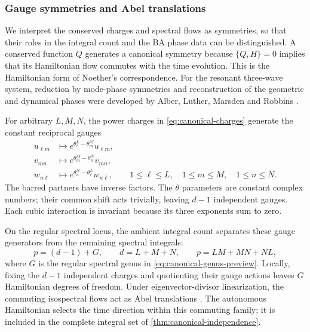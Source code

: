 \subsubsection{Gauge symmetries and Abel translations}
\label{sec:gauge-Abel-symmetries}

We interpret the conserved charges and spectral flows as symmetries,
so that their roles in the integral count and the BA phase data can
be distinguished. A conserved function $Q$ generates a canonical
symmetry because $\{Q,H\}=0$ implies that its Hamiltonian flow
commutes with the time evolution. This is the Hamiltonian form of
Noether's correspondence.
For the resonant three-wave system, reduction by mode-phase symmetries
and reconstruction of the geometric and dynamical phases were developed
by Alber, Luther, Marsden and Robbins
\cite[Sections~2--4]{AlberLutherMarsdenRobbins1998}.

For arbitrary $L,M,N$, the power charges in
\cref{eq:canonical-charges} generate the constant reciprocal gauges
\begin{equation}\label{eq:general-mode-gauge-action}
\begin{aligned}
 u_{\ell m}&\longmapsto e^{\theta_\ell^L-\theta_m^M}u_{\ell m},\\
 v_{mn}&\longmapsto e^{\theta_m^M-\theta_n^N}v_{mn},\\
 w_{n\ell}&\longmapsto e^{\theta_n^N-\theta_\ell^L}w_{n\ell},
 \qquad1\leq\ell\leq L,\quad1\leq m\leq M,\quad1\leq n\leq N.
\end{aligned}
\end{equation}
The barred partners have inverse factors. The $\theta$ parameters
are constant complex numbers; their common shift acts trivially,
leaving $d-1$ independent gauges. Each cubic interaction is invariant
because its three exponents sum to zero.

On the regular spectral locus, the ambient integral count separates these gauge generators
from the remaining spectral integrals:
\begin{equation}\label{eq:gauge-translation-count}
 p=(d-1)+G,\qquad d=L+M+N,
 \qquad p=LM+MN+NL,
\end{equation}
where $G$ is the regular spectral genus in
\cref{eq:canonical-genus-preview}. Locally, fixing the $d-1$ independent
charges and quotienting their gauge actions leaves $G$ Hamiltonian
degrees of freedom. Under eigenvector-divisor linearization, the
commuting isospectral flows act as Abel translations
\cite{Beauville1990,Vanhaecke2001}. The autonomous Hamiltonian selects
the time direction within this commuting family; it is included in the
complete integral set of \cref{thm:canonical-independence}.

